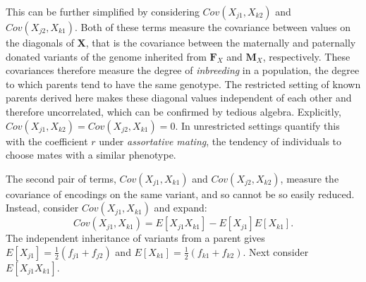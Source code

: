 \documentclass{article}
\newcommand{\m}[1]{\mathbf{#1}}               %
\begin{document}
This can be further simplified by considering $Cov(X_{j1}, X_{k2})$ and $Cov(X_{j2}, X_{k1})$. Both of these terms measure the covariance between values on the diagonals of $\m{X}$, that is the covariance between the maternally and paternally donated variants of the genome inherited from $\m{F}_X$ and $\m{M}_X$, respectively. These covariances therefore measure the degree of \emph{inbreeding} in a population, the degree to which parents tend to have the same genotype. The restricted setting of known parents derived here makes these diagonal values independent of each other and therefore uncorrelated, which can be confirmed by tedious algebra. Explicitly, $Cov(X_{j1}, X_{k2}) = Cov(X_{j2}, X_{k1}) = 0$. In unrestricted settings \cite{crowkimura1970intro} quantify this with the coefficient $r$ under \emph{assortative mating}, the tendency of individuals to choose mates with a similar phenotype.  

The second pair of terms, $Cov(X_{j1}, X_{k1})$ and $Cov(X_{j2}, X_{k2})$, measure the covariance of encodings on the same variant, and so cannot be so easily reduced. Instead, consider $Cov(X_{j1}, X_{k1})$ and expand:
$$Cov(X_{j1}, X_{k1}) = E[X_{j1} X_{k1}] - E[X_{j1}]E[X_{k1}].$$
The independent inheritance of variants from a parent gives $E[X_{j1}] = \frac{1}{2}(f_{j1} + f_{j2})$ and $E[X_{k1}] = \frac{1}{2}(f_{k1} + f_{k2})$. Next consider $E[X_{j1} X_{k1}]$.
\end{document}
